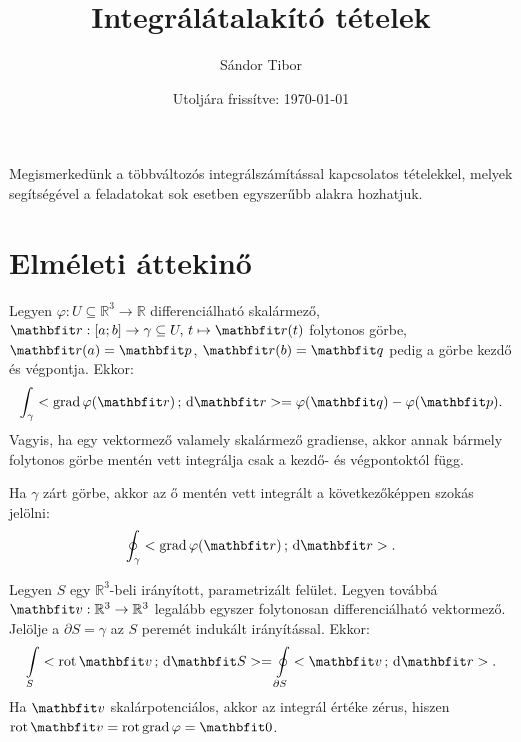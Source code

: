 \documentclass[lang=magyar]{math-handout}
\title{Integrálátalakító tételek}
\date{Utoljára frissítve: \today}
\author{Sándor Tibor}
\begin{document}
\allowdisplaybreaks

\maketitle

\vspace{1em}

\begin{summary}
  Megismerkedünk a többváltozós integrálszámítással kapcsolatos tételekkel,
  melyek segítségével a feladatokat sok esetben egyszerűbb alakra hozhatjuk.
\end{summary}

\vspace{-1em}

\section{Elméleti áttekinő}

\vspace{1em}

\begin{theorem}
  Legyen $\varphi : U \subseteq \mathbb R^3 \rightarrow \mathbb R$
  differenciálható skalármező, $\arcv : [a;b] \rightarrow \gamma \subseteq U,
    \, t \mapsto \arcv(t)$ folytonos görbe, $\arcv(a) = \rvec p$, $\arcv(b) =
    \rvec q$ pedig a görbe kezdő és végpontja. Ekkor:
  \[
    \int_\gamma \scalar{\grad \varphi(\coordv)}{\diff \rvec r}
    =
    \varphi(\rvec q) - \varphi(\rvec p)
    \text.
  \]
  Vagyis, ha egy vektormező valamely skalármező gradiense, akkor annak bármely
  folytonos görbe mentén vett integrálja csak a kezdő- és végpontoktól függ.
\end{theorem}

\vfill

\begin{note}
  Ha $\gamma$ zárt görbe, akkor az ő mentén vett integrált a következőképpen
  szokás jelölni:
  \[
    \oint_\gamma \scalar{\grad \varphi(\coordv)}{\diff \rvec r}
    \text.
  \]
\end{note}

\vfill

\begin{theorem}
  Legyen $S$ egy $\mathbb R^3$-beli irányított, parametrizált felület.
  Legyen továbbá $\rvec v : \mathbb R^3 \rightarrow \mathbb R^3$ legalább
  egyszer folytonosan differenciálható vektormező. Jelölje a $\partial S =
    \gamma$ az $S$ peremét indukált irányítással. Ekkor:
  \[
    \int \limits_S \scalar{\rot \rvec v}{\diff \rvec S}
    =
    \oint \limits_{\partial S} \scalar{\rvec v}{\diff \rvec r}
    \text.
  \]
  Ha $\rvec v$ skalárpotenciálos, akkor az integrál értéke zérus, hiszen
  $\rot \rvec v = \rot \grad \varphi = \rvec 0$.
\end{theorem}
\end{document}
